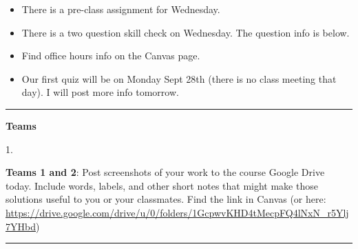 \documentclass[12pt,letterpaper,noanswers]{exam}
\begin{document}
 \pdfpageheight 11in 
  \pdfpagewidth 8.5in

\noindent 





\begin{itemize}
\itemsep0em
    \item There is a pre-class assignment for Wednesday.
    \item There is a two question skill check on Wednesday.  The question info is below.
    \item Find office hours info on the Canvas page.
    \item Our first quiz will be on Monday Sept 28th (there is no class meeting that day).  I will post more info tomorrow.
\end{itemize}

\hrule
\vspace{0.2cm}


\noindent\textbf{Teams}

\begin{multicols}{2}
1. 
\end{multicols}

\noindent \textbf{Teams 1 and 2}: Post screenshots of your work to the course Google Drive today.  Include words, labels, and other short notes that might make those solutions useful to you or your classmates.  Find the link in Canvas (or here: \url{https://drive.google.com/drive/u/0/folders/1GcpwvKHD4tMecpFQ4lNxN_r5Ylj7YHbd})


\vspace{0.2cm}
\hrule
\vspace{0.2cm}
\end{document}
